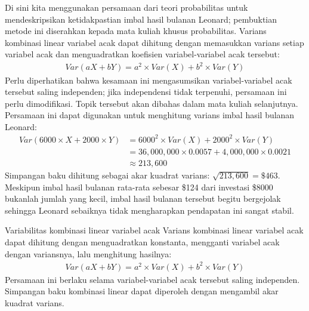 Di sini kita menggunakan persamaan dari teori probabilitas untuk
mendeskripsikan ketidakpastian imbal hasil bulanan Leonard;
pembuktian metode ini diserahkan kepada mata kuliah
khusus probabilitas.
Varians kombinasi linear variabel acak
dapat dihitung dengan memasukkan varians setiap
variabel acak dan menguadratkan koefisien
variabel-variabel acak tersebut:
\begin{align*}
Var(aX + bY) = a^2\times Var(X) + b^2\times Var(Y)
\end{align*}
Perlu diperhatikan bahwa kesamaan ini mengasumsikan
variabel-variabel acak tersebut saling independen;
jika independensi tidak terpenuhi, persamaan ini
perlu dimodifikasi. Topik tersebut akan
dibahas dalam mata kuliah selanjutnya.
Persamaan ini dapat digunakan untuk menghitung varians
imbal hasil bulanan Leonard:
\begin{align*}
Var(6000\times X + 2000\times Y)
	&= 6000^2\times Var(X) + 2000^2\times Var(Y) \\
	&= 36,000,000\times 0.0057 + 4,000,000\times 0.0021 \\
	&\approx 213,600
\end{align*}
Simpangan baku dihitung sebagai akar kuadrat
varians: $\sqrt{213,600} = \$463$.
Meskipun imbal hasil bulanan rata-rata sebesar \$124 dari
investasi \$8000 bukanlah jumlah yang kecil,
imbal hasil bulanan tersebut begitu bergejolak sehingga Leonard sebaiknya
tidak mengharapkan pendapatan ini sangat stabil.

\begin{onebox}{Variabilitas kombinasi linear variabel acak}
Varians kombinasi linear variabel acak dapat dihitung dengan menguadratkan konstanta, mengganti variabel acak dengan variansnya, lalu menghitung hasilnya:
\begin{align*}
Var(aX + bY) = a^2\times Var(X) + b^2\times Var(Y)
\end{align*}
Persamaan ini berlaku selama variabel-variabel acak tersebut saling independen. Simpangan baku kombinasi linear dapat diperoleh dengan mengambil akar kuadrat varians.
\end{onebox}

